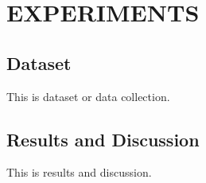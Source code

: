 \section{EXPERIMENTS}
\label{sec:exp}

\subsection{Dataset}
\label{sec:dataset}

This is dataset or data collection.

\subsection{Results and Discussion}
\label{subsec:results}

This is results and discussion.
